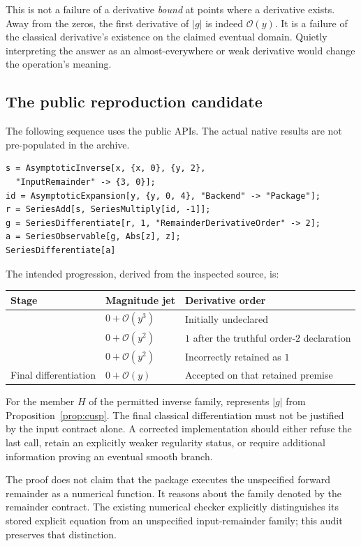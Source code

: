 \documentclass[11pt,a4paper]{article}
\newcommand{\code}[1]{\texttt{\detokenize{#1}}}
\newcommand{\OO}{\mathcal O}
\begin{document}
This is not a failure of a derivative \emph{bound} at points where a derivative
exists. Away from the zeros, the first derivative of $|g|$ is indeed
$\OO(y)$. It is a failure of the classical derivative's existence on the
claimed eventual domain. Quietly interpreting the answer as an almost-everywhere
or weak derivative would change the operation's meaning.

\subsection{The public reproduction candidate}
The following sequence uses the public APIs. The actual native results are not
pre-populated in the archive.
\begin{lstlisting}
s = AsymptoticInverse[x, {x, 0}, {y, 2},
  "InputRemainder" -> {3, 0}];
id = AsymptoticExpansion[y, {y, 0, 4}, "Backend" -> "Package"];
r = SeriesAdd[s, SeriesMultiply[id, -1]];
g = SeriesDifferentiate[r, 1, "RemainderDerivativeOrder" -> 2];
a = SeriesObservable[g, Abs[z], z];
SeriesDifferentiate[a]
\end{lstlisting}
The intended progression, derived from the inspected source, is:
\begin{center}
\begin{tabular}{@{}lll@{}}
\toprule Stage & Magnitude jet & Derivative order\\\midrule
\code{r} & $0+\OO(y^3)$ & Initially undeclared\\
\code{g} & $0+\OO(y^2)$ & $1$ after the truthful order-$2$ declaration\\
\code{a} & $0+\OO(y^2)$ & Incorrectly retained as $1$\\
Final differentiation & $0+\OO(y)$ & Accepted on that retained premise\\
\bottomrule
\end{tabular}
\end{center}
For the member $H$ of the permitted inverse family, \code{a} represents $|g|$
from Proposition~\ref{prop:cusp}. The final classical differentiation must not be
justified by the input contract alone. A corrected implementation should either
refuse the last call, retain an explicitly weaker regularity status, or require
additional information proving an eventual smooth branch.

The proof does not claim that the package executes the unspecified forward
remainder as a numerical function. It reasons about the family denoted by the
remainder contract. The existing numerical checker explicitly distinguishes its
stored explicit equation from an unspecified input-remainder family; this audit
preserves that distinction.\cite{numerical}
\end{document}
